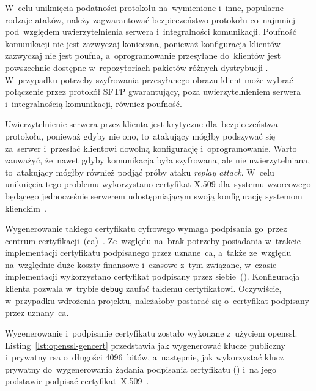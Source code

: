 \documentclass[thesis]{subfiles}
\begin{document}
W~celu uniknięcia podatności protokołu na~wymienione i~inne, popularne rodzaje ataków, należy zagwarantować bezpieczeństwo protokołu co~najmniej pod~względem uwierzytelnienia serwera i~integralności komunikacji. Poufność komunikacji nie jest zazwyczaj konieczna, ponieważ konfiguracja klientów zazwyczaj nie jest poufna, a~oprogramowanie przesyłane do~klientów jest powszechnie dostępne w~\href{https://wiki.archlinux.org/index.php/official_repositories}{repozytoriach pakietów} różnych dystrybucji . W~przypadku potrzeby szyfrowania przesyłanego obrazu klient może wybrać połączenie przez protokół SFTP gwarantujący, poza uwierzytelnieniem serwera i~integralnością komunikacji, również poufność.

Uwierzytelnienie serwera przez klienta jest krytyczne dla~bezpieczeństwa protokołu, ponieważ gdyby nie ono, to~atakujący mógłby podszywać się za~serwer i~przesłać klientowi dowolną konfigurację i~oprogramowanie. Warto zauważyć, że~nawet gdyby komunikacja była szyfrowana, ale nie uwierzytelniana, to~atakujący mógłby również podjąć próby ataku \emph{replay attack}. W~celu uniknięcia tego problemu wykorzystano certyfikat \href{https://en.wikipedia.org/wiki/X.509}{X.509} dla~systemu wzorcowego będącego jednocześnie serwerem udostępniającym swoją konfigurację systemom klienckim~\cite{wiki:x509}.

Wygenerowanie takiego certyfikatu cyfrowego wymaga podpisania go~przez centrum certyfikacji~(\gls{ca})~\cite{wiki:ca}. Ze~względu na~brak potrzeby posiadania w~trakcie implementacji certyfikatu podpisanego przez uznane~\gls{ca}, a~także ze~względu na~względnie duże koszty finansowe i~czasowe z~tym związane, w~czasie implementacji wykorzystano certyfikat podpisany przez siebie~(). Konfiguracja klienta pozwala w~trybie \texttt{debug} zaufać takiemu certyfikatowi. Oczywiście, w~przypadku wdrożenia projektu, należałoby postarać się o~certyfikat podpisany przez uznany~\gls{ca}.

Wygenerowanie i~podpisanie certyfikatu zostało wykonane z~użyciem \gls{openssl}. Listing~\ref{lst:openssl-gencert} przedstawia jak wygenerować klucze publiczny i~prywatny \gls{rsa} o~długości 4096~bitów, a~następnie, jak wykorzystać klucz prywatny do~wygenerowania żądania podpisania certyfikatu () i~na jego podstawie podpisać certyfikat~X.509~\cite{openssl-cookbook,wiki:csr}.
\end{document}
